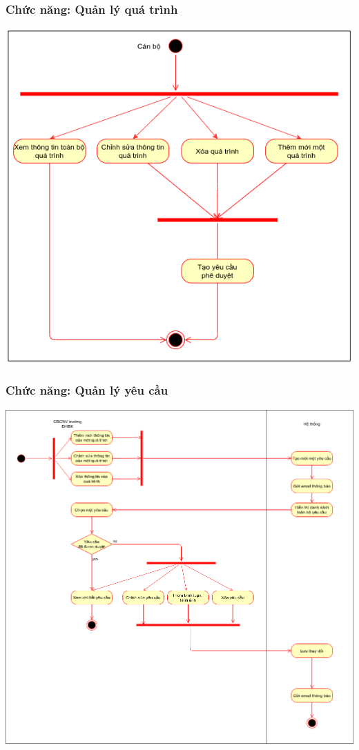 \subsubsection{Chức năng: Quản lý quá trình}
\begin{center}
  \captionsetup{type=figure}
  \includegraphics[width=15cm]{img/UML/User/activityQuanLyQT.png}
\end{center}

\subsubsection{Chức năng: Quản lý yêu cầu}
\begin{center}
  \captionsetup{type=figure}
  \includegraphics[width=15cm]{img/UML/User/activityQLTask.png}
\end{center}